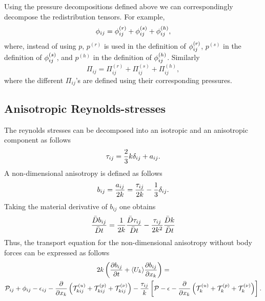 \documentclass[oneside,a4paper,11pt]{report}
\begin{document}
Using the pressure decompositions defined above we can correspondingly decompose the redistribution tensors. For example,
\begin{equation}
\phi_{ij} = \phi_{ij}^{(r)} + \phi_{ij}^{(s)} + \phi_{ij}^{(h)},
\end{equation}
where, instead of using $p$, $p^{(r)}$ is used in the definition of $\phi^{(r)}_{ij}$, $p^{(s)}$ in the definition of $\phi^{(s)}_{ij}$, and $p^{(h)}$ in the definition of $\phi^{(h)}_{ij}$. Similarly
\begin{equation}
\Pi_{ij} = \Pi^{(r)}_{ij} + \Pi^{(s)}_{ij} + \Pi^{(h)}_{ij},
\end{equation}
where the different $\Pi_{ij}$'s are defined using their corresponding pressures.

\subsection{Anisotropic Reynolds-stresses}

The reynolds stresses can be decomposed into an isotropic and an anisotropic component as follows
\begin{equation}
\tau_{ij} = \frac{2}{3} k \delta_{ij} + a_{ij}.
\end{equation}
A non-dimensional anisotropy is defined as follows
\begin{equation}
b_{ij} = \frac{a_{ij}}{2k} = \frac{\tau_{ij}}{2k} - \frac{1}{3} \delta_{ij}.
\end{equation}
Taking the material derivative of $b_{ij}$ one obtains 
\[ \frac{\bar{D} b_{ij}}{\bar{D}t} = \frac{1}{2k} \frac{\bar{D}\tau_{ij} }{\bar{D}t} - \frac{\tau_{ij}}{2k^2} \frac{\bar{D} k}{\bar{D}t} \]
Thus, the transport equation for the non-dimensional anisotropy without body forces can be expressed as follows
\begin{multline}
\label{anisotropy_eq}
2k \left( \frac{\partial b_{ij}}{\partial t} + \langle U_k \rangle \frac{\partial b_{ij}}{\partial x_k} \right ) =\\ \mathcal{P}_{ij} + \phi_{ij} - \epsilon_{ij} - \frac{\partial}{\partial x_k} \left ( \mathcal{T}^{(u)}_{kij} + \mathcal{T}^{(p)}_{kij} + \mathcal{T}^{(\nu)}_{kij} \right ) - \frac{\tau_{ij}}{k} \left [ \mathcal{P} - \epsilon - \frac{\partial}{\partial x_k} \left ( \mathcal{T}^{(u)}_{k} + \mathcal{T}^{(p)}_{k} + \mathcal{T}^{(\nu)}_{k} \right ) \right ].
\end{multline}
\end{document}
